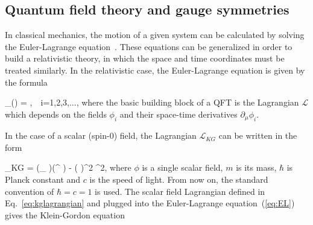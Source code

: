 


\subsection{Quantum field theory and gauge symmetries}

In classical mechanics, the motion of a given system can be calculated by solving the Euler-Lagrange equation~\cite{9783527411887}. These equations can be generalized in order to build a relativistic theory, in which the space and time coordinates must be treated similarly. In the relativistic case, the Euler-Lagrange equation is given by the formula

{
 \partial_{\mu}\left (\right) = ,~~i=1,2,3,...,
}
where the basic building block of a QFT is the Lagrangian $\mathcal{L}$ which depends on the fields $\phi_{i}$ and their space-time derivatives $\partial_{\mu}\phi_{i}$. 

In the case of a scalar (spin-0) field, the Lagrangian $\mathcal{L}_{KG}$ can be written in the form 

{
 _{KG} = (\partial_{\mu} \phi)(\partial^{\mu} \phi) -  \left( \right)^{2} \phi^{2},
}
where $\phi$ is a single scalar field, $m$ is its mass, $\hbar$ is Planck constant and $c$ is the speed of light. From now on, the standard convention of $\hbar = c = 1$ is used. The scalar field Lagrangian defined in Eq.~\ref{eq:kglagrangian} and plugged into the Euler-Lagrange equation~(\ref{eq:EL}) gives the Klein-Gordon equation

